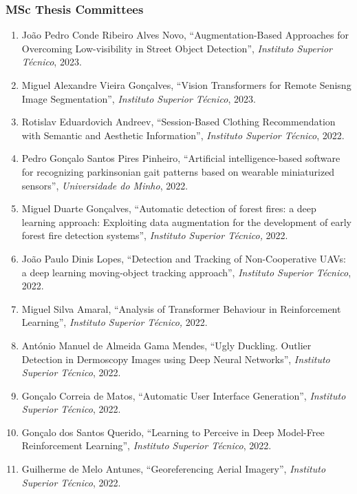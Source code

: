 \documentclass[
]{article}
\begin{document}
\subsubsection{MSc Thesis Committees}\label{msc-thesis-committees}

\begin{enumerate}
\def\labelenumi{\arabic{enumi}.}
\item
  João Pedro Conde Ribeiro Alves Novo, ``Augmentation-Based Approaches
  for Overcoming Low-visibility in Street Object Detection'',
  \emph{Instituto Superior Técnico}, 2023.
\item
  Miguel Alexandre Vieira Gonçalves, ``Vision Transformers for Remote
  Senisng Image Segmentation'', \emph{Instituto Superior Técnico}, 2023.
\item
  Rotislav Eduardovich Andreev, ``Session-Based Clothing Recommendation
  with Semantic and Aesthetic Information'', \emph{Instituto Superior
  Técnico}, 2022.
\item
  Pedro Gonçalo Santos Pires Pinheiro, ``Artificial intelligence-based
  software for recognizing parkinsonian gait patterns based on wearable
  miniaturized sensors'', \emph{Universidade do Minho}, 2022.
\item
  Miguel Duarte Gonçalves, ``Automatic detection of forest fires: a deep
  learning approach: Exploiting data augmentation for the development of
  early forest fire detection systems'', \emph{Instituto Superior
  Técnico,} 2022.
\item
  João Paulo Dinis Lopes, ``Detection and Tracking of Non-Cooperative
  UAVs: a deep learning moving-object tracking approach'',
  \emph{Instituto Superior Técnico}, 2022.
\item
  Miguel Silva Amaral, ``Analysis of Transformer Behaviour in
  Reinforcement Learning'', \emph{Instituto Superior Técnico,} 2022.
\item
  António Manuel de Almeida Gama Mendes, ``Ugly Duckling. Outlier
  Detection in Dermoscopy Images using Deep Neural Networks'',
  \emph{Instituto Superior Técnico}, 2022.
\item
  Gonçalo Correia de Matos, ``Automatic User Interface Generation'',
  \emph{Instituto Superior Técnico}, 2022.
\item
  Gonçalo dos Santos Querido, ``Learning to Perceive in Deep Model-Free
  Reinforcement Learning'', \emph{Instituto Superior Técnico}, 2022.
\item
  Guilherme de Melo Antunes, ``Georeferencing Aerial Imagery'',
  \emph{Instituto Superior Técnico}, 2022.

\end{enumerate}
\end{document}
